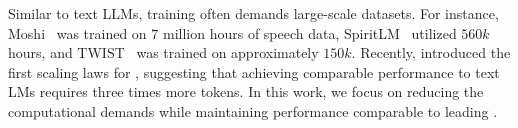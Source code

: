 Similar to text \ac{LLMs}, training \slms often demands large-scale datasets. For instance, Moshi~\cite{defossez2024moshi} was trained on $7$ million hours of speech data, SpiritLM~\cite{spiritlm} utilized $560k$ hours, and TWIST~\cite{twist} was trained on approximately $150k$. Recently, \citet{cuervo2024scaling} introduced the first scaling laws for \slms, suggesting that achieving comparable performance to text LMs requires three times more tokens. In this work, we focus on reducing the computational demands while maintaining performance comparable to leading \slms. 